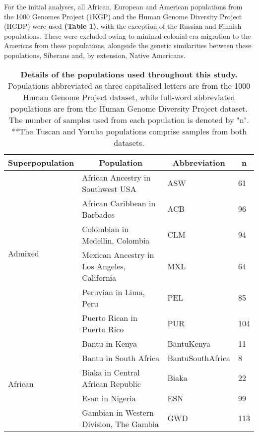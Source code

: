 \documentclass[11pt]{article}
\begin{document}
For the initial analyses, all African, European and American populations from the 1000 Genomes Project (1KGP) and the Human Genome Diversity Project (HGDP) were used \textbf{(Table 1)}, with the exception of the Russian and Finnish populations. These were excluded owing to minimal colonial-era migration to the Americas from these populations, alongside the genetic similarities between these populations, Siberans and, by extension, Native Americans.



\begin{table}[htb]
    \centering
    \caption{
        \textbf{Details of the populations used throughout this study.} 
        Populations abbreviated as three capitalised letters are from the 1000 Human Genome Project dataset, while full-word abbreviated populations are from the Human Genome Diversity Project dataset. The number of samples used from each population is denoted by "n". \\
        **The Tuscan and Yoruba populations comprise samples from both datasets.
        }
    \small
    \begin{tabular}{ |p{3cm}||p{8cm}|p{3cm}|p{0.8cm}|  }
    \hline
    \multicolumn{1}{|c||}{\textbf{Superpopulation}} &
    \multicolumn{1}{c|}{\textbf{Population}} & 
    \multicolumn{1}{c|}{\textbf{Abbreviation}} & %
    \multicolumn{1}{c|}{\textbf{n}}\\
    \hline
    \hline
    \multirow{6}{*}{Admixed}  %
        &African Ancestry in Southwest USA & ASW & 61 \\
        &African Caribbean in Barbados & ACB & 96 \\
        &Colombian in Medellin, Colombia & CLM & 94 \\
        &Mexican Ancestry in Los Angeles, California & MXL & 64 \\
        &Peruvian in Lima, Peru & PEL & 85 \\
        &Puerto Rican in Puerto Rico & PUR & 104 \\
        \hline
    \multirow{11}{*}{African}
        &Bantu in Kenya & BantuKenya & 11 \\
        &Bantu in South Africa & BantuSouthAfrica & 8 \\
        &Biaka in Central African Republic & Biaka & 22 \\
        &Esan in Nigeria & ESN & 99 \\
        &Gambian in Western Division, The Gambia & GWD & 113 \\

\end{tabular}
\end{table}
\end{document}
